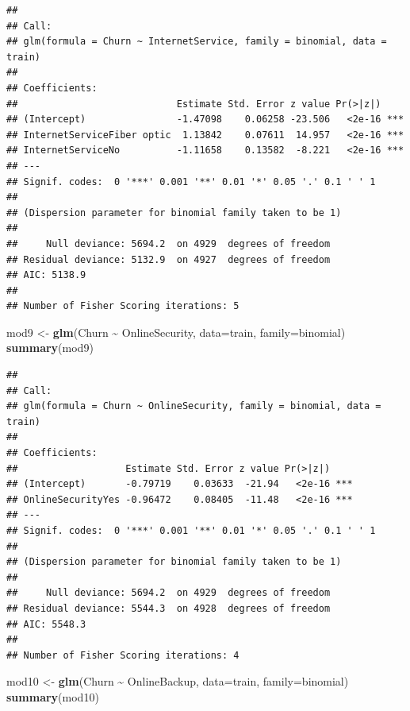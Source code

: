 \documentclass[
  twoside]{article}
\newenvironment{Shaded}{\begin{snugshade}}{\end{snugshade}}
\newcommand{\AttributeTok}[1]{\textcolor[rgb]{0.13,0.29,0.53}{#1}}
\newcommand{\FunctionTok}[1]{\textcolor[rgb]{0.13,0.29,0.53}{\textbf{#1}}}
\newcommand{\NormalTok}[1]{#1}
\newcommand{\OtherTok}[1]{\textcolor[rgb]{0.56,0.35,0.01}{#1}}
\newcommand{\SpecialCharTok}[1]{\textcolor[rgb]{0.81,0.36,0.00}{\textbf{#1}}}
\begin{document}
\begin{verbatim}
## 
## Call:
## glm(formula = Churn ~ InternetService, family = binomial, data = train)
## 
## Coefficients:
##                            Estimate Std. Error z value Pr(>|z|)    
## (Intercept)                -1.47098    0.06258 -23.506   <2e-16 ***
## InternetServiceFiber optic  1.13842    0.07611  14.957   <2e-16 ***
## InternetServiceNo          -1.11658    0.13582  -8.221   <2e-16 ***
## ---
## Signif. codes:  0 '***' 0.001 '**' 0.01 '*' 0.05 '.' 0.1 ' ' 1
## 
## (Dispersion parameter for binomial family taken to be 1)
## 
##     Null deviance: 5694.2  on 4929  degrees of freedom
## Residual deviance: 5132.9  on 4927  degrees of freedom
## AIC: 5138.9
## 
## Number of Fisher Scoring iterations: 5
\end{verbatim}

\begin{Shaded}
\begin{Highlighting}[]
\NormalTok{mod9 }\OtherTok{\textless{}{-}} \FunctionTok{glm}\NormalTok{(Churn }\SpecialCharTok{\textasciitilde{}}\NormalTok{ OnlineSecurity, }\AttributeTok{data=}\NormalTok{train, }\AttributeTok{family=}\NormalTok{binomial)}
\FunctionTok{summary}\NormalTok{(mod9)}
\end{Highlighting}
\end{Shaded}

\begin{verbatim}
## 
## Call:
## glm(formula = Churn ~ OnlineSecurity, family = binomial, data = train)
## 
## Coefficients:
##                   Estimate Std. Error z value Pr(>|z|)    
## (Intercept)       -0.79719    0.03633  -21.94   <2e-16 ***
## OnlineSecurityYes -0.96472    0.08405  -11.48   <2e-16 ***
## ---
## Signif. codes:  0 '***' 0.001 '**' 0.01 '*' 0.05 '.' 0.1 ' ' 1
## 
## (Dispersion parameter for binomial family taken to be 1)
## 
##     Null deviance: 5694.2  on 4929  degrees of freedom
## Residual deviance: 5544.3  on 4928  degrees of freedom
## AIC: 5548.3
## 
## Number of Fisher Scoring iterations: 4
\end{verbatim}

\begin{Shaded}
\begin{Highlighting}[]
\NormalTok{mod10 }\OtherTok{\textless{}{-}} \FunctionTok{glm}\NormalTok{(Churn }\SpecialCharTok{\textasciitilde{}}\NormalTok{ OnlineBackup, }\AttributeTok{data=}\NormalTok{train, }\AttributeTok{family=}\NormalTok{binomial)}
\FunctionTok{summary}\NormalTok{(mod10)}
\end{Highlighting}
\end{Shaded}
\end{document}

